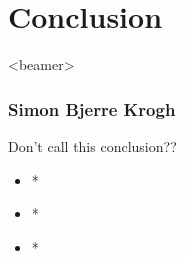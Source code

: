 \section{Conclusion}
\begin{frame}<beamer>
\frametitle{Simon Bjerre Krogh}
\tableofcontents[currentsection]
\end{frame}


\begin{frame}{Don't call this conclusion??}{}

  \begin{itemize}
    \item<1-> *
    \item<2-> *
    \item<3-> *
  \end{itemize}



\end{frame}


